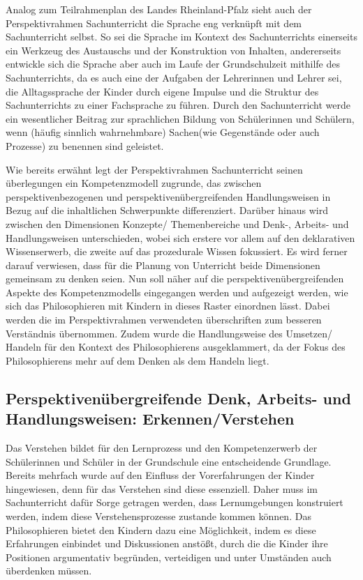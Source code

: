 Analog zum Teilrahmenplan des Landes Rheinland-Pfalz sieht auch der Perspektivrahmen Sachunterricht die Sprache eng verknüpft mit dem Sachunterricht selbst. 
So sei die Sprache im Kontext des Sachunterrichts einerseits ein Werkzeug des Austauschs und der Konstruktion von Inhalten, andererseits entwickle sich die Sprache aber auch im Laufe der Grundschulzeit mithilfe des Sachunterrichts, da es auch eine der Aufgaben der Lehrerinnen und Lehrer sei, die Alltagssprache der Kinder durch eigene Impulse und die Struktur des Sachunterrichts zu einer Fachsprache zu führen. 
Durch den Sachunterricht werde ein wesentlicher \glqq Beitrag zur sprachlichen Bildung von Schülerinnen und Schülern, wenn (häufig sinnlich wahrnehmbare) \glqq Sachen\grqq (wie Gegenstände oder auch Prozesse) zu benennen sind\grqq{}\cite{GDS13, S.11} geleistet.

Wie bereits erwähnt legt der Perspektivrahmen Sachunterricht seinen überlegungen ein Kompetenzmodell zugrunde, das zwischen perspektivenbezogenen und perspektivenübergreifenden Handlungsweisen in Bezug auf die inhaltlichen Schwerpunkte differenziert.
 Darüber hinaus wird zwischen den Dimensionen \glqq Konzepte/ Themenbereiche\grqq{} und \glqq Denk-, Arbeits- und Handlungsweisen\grqq{} unterschieden, wobei sich erstere vor allem auf den deklarativen Wissenserwerb, die zweite auf das prozedurale Wissen fokussiert. 
 Es wird ferner darauf verwiesen, dass für die Planung von Unterricht beide Dimensionen gemeinsam zu denken seien.
 Nun soll näher auf die perspektivenübergreifenden Aspekte des Kompetenzmodells eingegangen werden und aufgezeigt werden, wie sich das Philosophieren mit Kindern in dieses Raster einordnen lässt. 
 Dabei werden die im Perspektivrahmen verwendeten überschriften zum besseren Verständnis übernommen. 
Zudem wurde die Handlungsweise des Umsetzen/ Handeln für den Kontext des Philosophierens ausgeklammert, da der Fokus des Philosophierens mehr auf dem Denken als dem Handeln liegt.

\newpage

\subsection{Perspektivenübergreifende Denk, Arbeits- und Handlungsweisen: Erkennen/Verstehen}


Das Verstehen bildet für den Lernprozess und den Kompetenzerwerb der Schülerinnen und Schüler in der Grundschule eine entscheidende Grundlage. 
Bereits mehrfach wurde auf den Einfluss der Vorerfahrungen der Kinder hingewiesen, denn für das Verstehen sind diese essenziell. 
Daher muss im Sachunterricht dafür Sorge getragen werden, dass Lernumgebungen konstruiert werden, indem diese Verstehensprozesse zustande kommen können. 
Das Philosophieren bietet den Kindern dazu eine Möglichkeit, indem es diese Erfahrungen einbindet und Diskussionen anstößt, durch die die Kinder ihre Positionen argumentativ begründen, verteidigen und unter Umständen auch überdenken müssen. 

